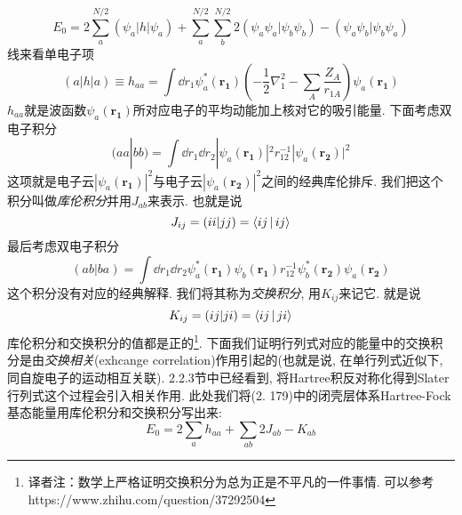 \begin{equation}
E_0 = 2 \sum_{a}^{N/2}(\psi_a|h|\psi_a) + \sum_{a}^{N/2}\sum_{b}^{N/2}2(\psi_a\psi_a|\psi_b\psi_b) - (\psi_a\psi_b|\psi_b\psi_a)
\end{equation}
线来看单电子项
\begin{equation}
(a|h|a) \equiv h_{aa} = \int\dd{r_1}\psi_a^*(\mathbf{r_1})\left( -\frac{1}{2}\nabla_1^2 - \sum_A\frac{Z_A}{r_{1A}} \right)\psi_a(\mathbf{r_1})
\end{equation}
$h_{aa}$就是波函数$\psi_a(\mathbf{r_1})$所对应电子的平均动能加上核对它的吸引能量. 下面考虑双电子积分
\begin{equation}
(aa|bb) = \int\dd{r_1}\dd{r_2}|\psi_a(\mathbf{r_1})|^2r_{12}^{-1}|\psi_a(\mathbf{r_2})|^2
\end{equation}
这项就是电子云$|\psi_a(\mathbf{r_1})|^2$与电子云$|\psi_a(\mathbf{r_2})|^2$之间的经典库伦排斥. 
我们把这个积分叫做\emph{库伦积分}并用$J_{ab}$来表示. 
也就是说
\begin{equation}
J_{ij} = (ii|jj) = \Braket{ij|ij}
\end{equation} 
最后考虑双电子积分
\begin{equation}
(ab|ba) = \int\dd{r_1}\dd{r_2} \psi_a^*(\mathbf{r_1})\psi_b(\mathbf{r_1}) r_{12}^{-1} \psi_b^*(\mathbf{r_2}) \psi_a(\mathbf{r_2})
\end{equation}
这个积分没有对应的经典解释. 
我们将其称为\emph{交换积分}, 
用$K_{ij}$来记它. 
就是说
\begin{equation}
K_{ij} = (ij|ji) = \Braket{ij|ji}
\end{equation}
库伦积分和交换积分的值都是正的\footnote{译者注：数学上严格证明交换积分为总为正是不平凡的一件事情. 可以参考 https://www.zhihu.com/question/37292504}. 
下面我们证明行列式对应的能量中的交换积分是由\emph{交换相关}(exhcange correlation)作用引起的(也就是说,
在单行列式近似下, 
同自旋电子的运动相互关联). 
2.2.3节中已经看到, 
将Hartree积反对称化得到Slater行列式这个过程会引入相关作用. 
此处我们将(2.
179)中的闭壳层体系Hartree-Fock基态能量用库伦积分和交换积分写出来:
\begin{equation}
E_0 = 2\sum_a h_{aa} + \sum_{ab}2J_{ab} - K_{ab} 
\end{equation}


